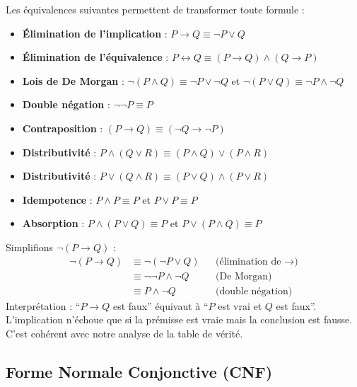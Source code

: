 \documentclass[11pt,a4paper]{article}
\begin{document}
\begin{theorembox}
Les équivalences suivantes permettent de transformer toute formule :
\begin{itemize}[nosep]
    \item \textbf{Élimination de l'implication} : $P \rightarrow Q \equiv \neg P \lor Q$
    \item \textbf{Élimination de l'équivalence} : $P \leftrightarrow Q \equiv (P \rightarrow Q) \land (Q \rightarrow P)$
    \item \textbf{Lois de De Morgan} : 
    $\neg(P \land Q) \equiv \neg P \lor \neg Q$ \quad et \quad $\neg(P \lor Q) \equiv \neg P \land \neg Q$
    \item \textbf{Double négation} : $\neg\neg P \equiv P$
    \item \textbf{Contraposition} : $(P \rightarrow Q) \equiv (\neg Q \rightarrow \neg P)$
    \item \textbf{Distributivité} : $P \land (Q \lor R) \equiv (P \land Q) \lor (P \land R)$
    \item \textbf{Distributivité} : $P \lor (Q \land R) \equiv (P \lor Q) \land (P \lor R)$
    \item \textbf{Idempotence} : $P \land P \equiv P$ \quad et \quad $P \lor P \equiv P$
    \item \textbf{Absorption} : $P \land (P \lor Q) \equiv P$ \quad et \quad $P \lor (P \land Q) \equiv P$
\end{itemize}
\end{theorembox}

\begin{exemplebox}
Simplifions $\neg(P \rightarrow Q)$ :
\begin{align*}
\neg(P \rightarrow Q) &\equiv \neg(\neg P \lor Q) && \text{(élimination de } \rightarrow \text{)} \\
&\equiv \neg\neg P \land \neg Q && \text{(De Morgan)} \\
&\equiv P \land \neg Q && \text{(double négation)}
\end{align*}
Interprétation : ``$P \rightarrow Q$ est faux'' équivaut à ``$P$ est vrai et $Q$ est faux''. L'implication n'échoue que si la prémisse est vraie mais la conclusion est fausse. C'est cohérent avec notre analyse de la table de vérité.
\end{exemplebox}

\subsection{Forme Normale Conjonctive (CNF)}
\end{document}
